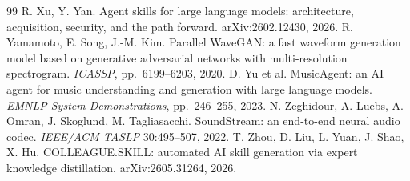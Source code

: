 \documentclass[10pt,twocolumn]{article}
\begin{document}
{\begin{thebibliography}{99}
 R. Xu, Y. Yan. Agent skills for large language models: architecture, acquisition, security, and the path forward. arXiv:2602.12430, 2026.
 R. Yamamoto, E. Song, J.-M. Kim. Parallel WaveGAN: a fast waveform generation model based on generative adversarial networks with multi-resolution spectrogram. \emph{ICASSP}, pp.\ 6199--6203, 2020.
 D. Yu et al. MusicAgent: an AI agent for music understanding and generation with large language models. \emph{EMNLP System Demonstrations}, pp.\ 246--255, 2023.
 N. Zeghidour, A. Luebs, A. Omran, J. Skoglund, M. Tagliasacchi. SoundStream: an end-to-end neural audio codec. \emph{IEEE/ACM TASLP} 30:495--507, 2022.
 T. Zhou, D. Liu, L. Yuan, J. Shao, X. Hu. COLLEAGUE.SKILL: automated AI skill generation via expert knowledge distillation. arXiv:2605.31264, 2026.
\end{thebibliography}}
\end{document}
